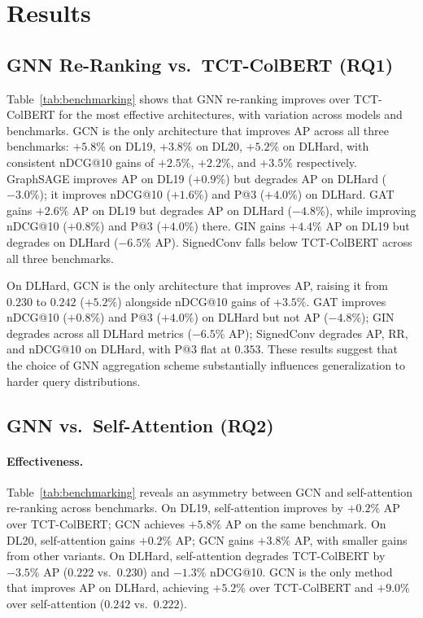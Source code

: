 \documentclass[runningheads]{llncs}
\begin{document}
\section{Results}

\subsection{GNN Re-Ranking vs.\ TCT-ColBERT (RQ1)}

Table~\ref{tab:benchmarking} shows that GNN re-ranking improves over TCT-ColBERT for the most effective architectures, with variation across models and benchmarks. GCN is the only architecture that improves AP across all three benchmarks: $+5.8\%$ on DL19, $+3.8\%$ on DL20, $+5.2\%$ on DLHard, with consistent nDCG@10 gains of $+2.5\%$, $+2.2\%$, and $+3.5\%$ respectively. GraphSAGE improves AP on DL19 ($+0.9\%$) but degrades AP on DLHard ($-3.0\%$); it improves nDCG@10 ($+1.6\%$) and P@3 ($+4.0\%$) on DLHard. GAT gains $+2.6\%$ AP on DL19 but degrades AP on DLHard ($-4.8\%$), while improving nDCG@10 ($+0.8\%$) and P@3 ($+4.0\%$) there. GIN gains $+4.4\%$ AP on DL19 but degrades on DLHard ($-6.5\%$ AP). SignedConv falls below TCT-ColBERT across all three benchmarks.

On DLHard, GCN is the only architecture that improves AP, raising it from $0.230$ to $0.242$ ($+5.2\%$) alongside nDCG@10 gains of $+3.5\%$. GAT improves nDCG@10 ($+0.8\%$) and P@3 ($+4.0\%$) on DLHard but not AP ($-4.8\%$); GIN degrades across all DLHard metrics ($-6.5\%$ AP); SignedConv degrades AP, RR, and nDCG@10 on DLHard, with P@3 flat at $0.353$. These results suggest that the choice of GNN aggregation scheme substantially influences generalization to harder query distributions.

\subsection{GNN vs.\ Self-Attention (RQ2)}

\paragraph{Effectiveness.}
Table~\ref{tab:benchmarking} reveals an asymmetry between GCN and self-attention re-ranking across benchmarks.
On DL19, self-attention improves by $+0.2\%$ AP over TCT-ColBERT; GCN achieves $+5.8\%$ AP on the same benchmark.
On DL20, self-attention gains $+0.2\%$ AP; GCN gains $+3.8\%$ AP, with smaller gains from other variants.
On DLHard, self-attention degrades TCT-ColBERT by $-3.5\%$ AP ($0.222$ vs.\ $0.230$) and $-1.3\%$ nDCG@10. GCN is the only method that improves AP on DLHard, achieving $+5.2\%$ over TCT-ColBERT and $+9.0\%$ over self-attention ($0.242$ vs.\ $0.222$).
\end{document}

